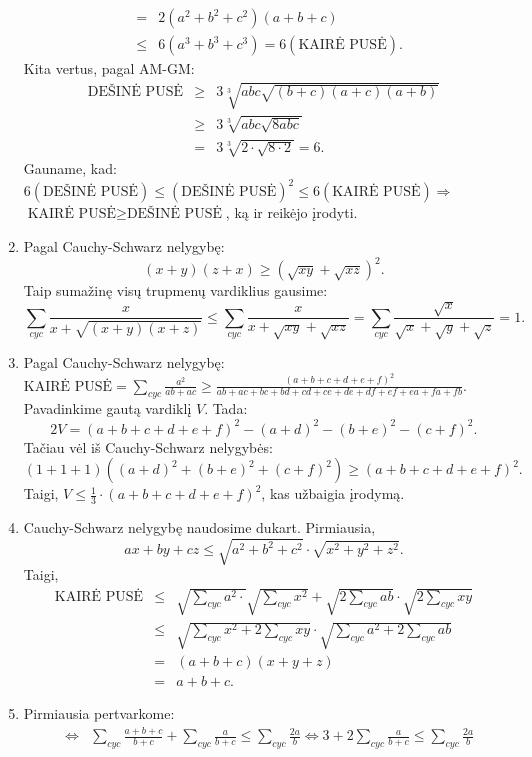 \begin{enumerate}
\begin{eqnarray*}
&=&2(a^2+b^2+c^2)(a+b+c)\\ &\leq&6(a^3+b^3+c^3)=6(\text{KAIRĖ
PUSĖ}).\end{eqnarray*} Kita vertus, pagal AM-GM:
\begin{eqnarray*}\text{DEŠINĖ
PUSĖ}&\geq&3\sqrt[3]{abc\sqrt{(b+c)(a+c)(a+b)}}\\&\geq&3{\sqrt[3]{abc\sqrt{8abc}}}\\&=&3\sqrt[3]{2\cdot\sqrt{8\cdot2}}=6.\end{eqnarray*}
Gauname, kad:\\ $6(\text{DEŠINĖ PUSĖ})\leq(\text{DEŠINĖ
PUSĖ})^2\leq6(\text{KAIRĖ PUSĖ})\Rightarrow$\\ $\text{KAIRĖ
PUSĖ}\geq\text{DEŠINĖ PUSĖ}$, ką ir reikėjo įrodyti.
\item 
Pagal Cauchy-Schwarz nelygybę:
$$(x+y)(z+x)\geq(\sqrt{xy}+\sqrt{xz})^2.$$ Taip sumažinę visų trupmenų
vardiklius gausime:
$$\sum_{cyc}{\frac{x}{x+\sqrt{(x+y)(x+z)}}}\leq\sum_{cyc}{\frac{x}{x+\sqrt{xy}+\sqrt{xz}}}=\sum_{cyc}{\frac{\sqrt{x}}{\sqrt{x}+\sqrt{y}+\sqrt{z}}}=1.$$
\item 
Pagal Cauchy-Schwarz nelygybę: \\$\mbox{KAIRĖ PUSĖ} =
\sum\limits_{cyc}\frac{a^2}{ab+ac} \geq
\frac{(a+b+c+d+e+f)^2}{ab+ac+bc+bd+cd+ce+de+df+ef+ea+fa+fb}.$
\\Pavadinkime gautą vardiklį $V$. Tada:
$$2V=(a+b+c+d+e+f)^2-(a+d)^2-(b+e)^2-(c+f)^2.$$ Tačiau vėl iš
Cauchy-Schwarz nelygybės:
$$\left(1+1+1\right)\left((a+d)^2+(b+e)^2+(c+f)^2\right)\geq(a+b+c+d+e+f)^2.$$
Taigi, $V\leq\frac{1}{3}\cdot(a+b+c+d+e+f)^2$, kas užbaigia įrodymą.
\item 
Cauchy-Schwarz nelygybę naudosime dukart. Pirmiausia,
$$ax+by+cz\leq\sqrt{a^2+b^2+c^2}\cdot\sqrt{x^2+y^2+z^2}.$$ Taigi,
\begin{eqnarray*}\text{KAIRĖ
PUSĖ}&\leq&\sqrt{\sum_{cyc}{a^2}\cdot}\sqrt{\sum_{cyc}{x^2}}+\sqrt{2\sum_{cyc}{ab}}\cdot\sqrt{2\sum_{cyc}{xy}}\\
&\leq&\sqrt{\sum_{cyc}{x^2}+2\sum_{cyc}{xy}}\cdot\sqrt{\sum_{cyc}{a^2}+2\sum_{cyc}{ab}}\\
&=&(a+b+c)(x+y+z)\\ &=&a+b+c.\end{eqnarray*}
\item 
Pirmiausia pertvarkome:
\begin{eqnarray*}&\Leftrightarrow&\sum_{cyc}\frac{a+b+c}{b+c}+\sum_{cyc}\frac{a}{b+c}\leq\sum_{cyc}\frac{2a}{b}\Leftrightarrow3+2\sum_{cyc}\frac{a}{b+c}\leq\sum_{cyc}\frac{2a}{b}\\

\end{eqnarray*}
\end{enumerate}
